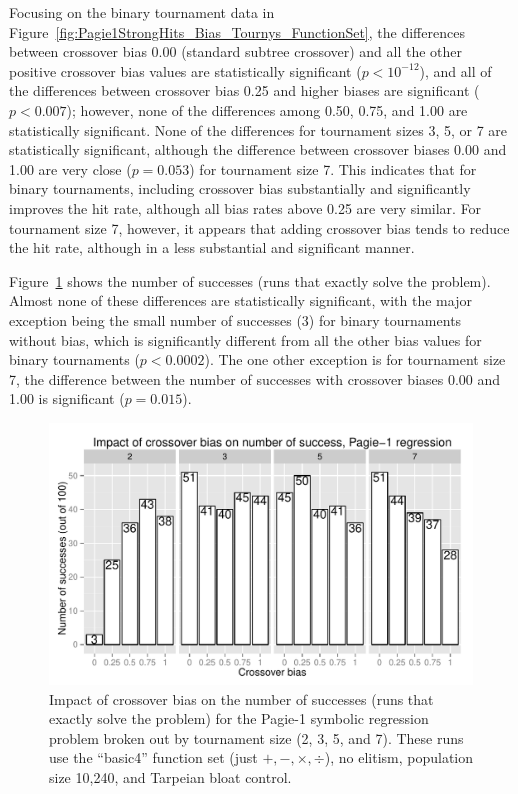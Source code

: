 \documentclass{sig-alternate}
\begin{document}
Focusing on the binary tournament data in Figure~\ref{fig:Pagie1StrongHits_Bias_Tournys_FunctionSet}, the differences between crossover
bias 0.00 (standard subtree crossover) and all the other positive crossover bias values are statistically significant
($p<10^{-12}$), and all of the differences between crossover bias 0.25 and higher biases are significant ($p<0.007$);
however, none of the differences among 0.50, 0.75, and 1.00 are statistically significant. None of the differences for
tournament sizes 3, 5, or 7 are statistically significant, although the difference between crossover biases 0.00 and
1.00 are very close ($p=0.053$) for tournament size 7. This indicates that for binary tournaments, including crossover
bias substantially and significantly improves the hit rate, although all bias rates above 0.25 are very similar. For
tournament size 7, however, it appears that adding crossover bias tends to reduce the hit rate, although in a less
substantial and significant manner.

%
%
%
%

Figure~\ref{fig:Pagie1StrongSuccesses} shows the number of successes (runs that exactly solve the problem). Almost none
of these differences are statistically significant, with the major exception being the small number of successes (3)
for binary tournaments without bias, which is significantly different from all the other bias values for binary
tournaments ($p<0.0002$). The one other exception is for tournament size 7, the difference between the number of
successes with crossover biases 0.00 and 1.00 is significant ($p=0.015$).

\begin{figure}
\centering
\includegraphics[width=0.45 \textwidth]{Plots/Pagie_1_Strong_Successes_vs_Bias.pdf}
\caption{Impact of crossover bias on the number of successes (runs that exactly solve the problem) for the Pagie-1
symbolic regression problem broken out by tournament size (2, 3, 5, and 7). These runs use the ``basic4'' function set
(just $+, -, \times, \div$), no elitism, population size 10,240, and Tarpeian bloat control.}
\label{fig:Pagie1StrongSuccesses}
\end{figure}
\end{document}
